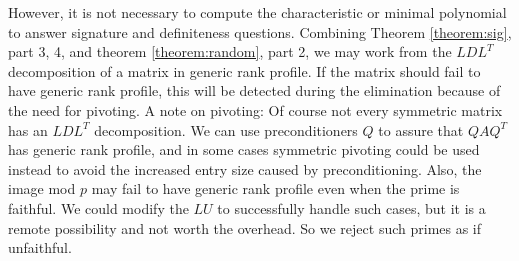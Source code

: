 \documentclass{acm_proc_article-sp}
\begin{document}


%
%

However,
it is not necessary to compute the characteristic or minimal 
polynomial to answer signature and definiteness questions.  
Combining Theorem \ref{theorem:sig}, part 3, 4, 
and theorem \ref{theorem:random},
part 2,  we may work from 
the $LDL^T$ decomposition of a matrix in generic rank profile.  
If the matrix should fail to have generic rank profile, this will be detected during
the elimination because of the need for pivoting.
A note on pivoting:
Of course not every symmetric matrix has an $LDL^T$ decomposition.  
We can use preconditioners $Q$ to assure that $QAQ^T$ has generic
rank profile,
and in some cases symmetric pivoting could be used instead to avoid the 
increased entry size caused by preconditioning.  Also, the image mod $p$ may
fail to have generic rank profile even when the prime is faithful.  
We could modify the $LU$ to successfully handle such cases, but it is a remote
possibility and not worth the overhead.  So we reject such primes as if unfaithful.
\end{document}
